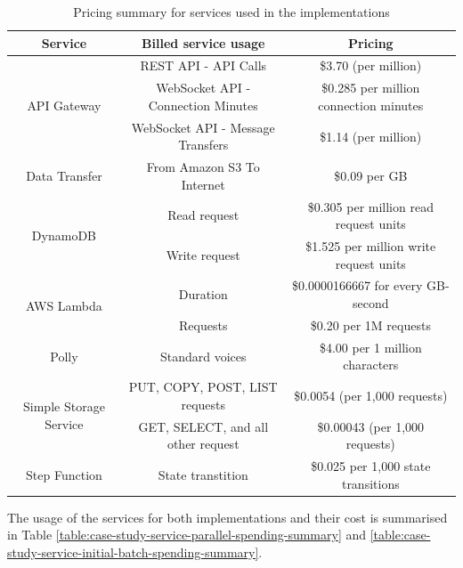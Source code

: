 \begin{table}[H]
    \centering
    \begin{tabular}{ |c|c|c| } 
    \hline
    Service & Billed service usage & Pricing \\
    \hline
    \multirow{3}{*}{API Gateway} & REST API - API Calls & \$3.70 (per million) \\ 
    & WebSocket API - Connection Minutes & \$0.285 per million connection minutes \\ 
    & WebSocket API - Message Transfers & \$1.14 (per million) \\ 
    \hline
    Data Transfer & From Amazon S3 To Internet & \$0.09 per GB \\
    \hline
    \multirow{2}{*}{DynamoDB} & Read request & \$0.305 per million read request units \\
    & Write request & \$1.525 per million write request units \\
    \hline
    \multirow{2}{*}{AWS Lambda} & Duration & \$0.0000166667 for every GB-second \\
    & Requests & \$0.20 per 1M requests \\
    \hline
    Polly & Standard voices & \$4.00 per 1 million characters \\
    \hline
    \multirow{2}{*}{Simple Storage Service} & PUT, COPY, POST, LIST requests & \$0.0054 (per 1,000 requests) \\
    & GET, SELECT, and all other request & \$0.00043 (per 1,000 requests) \\
    \hline
    Step Function & State transtition & \$0.025 per 1,000 state transitions\\
    \hline
    \end{tabular}
    \caption{Pricing summary for services used in the implementations}
    \label{table:case-study-service-spendings-summary}
\end{table}

The usage of the services for both implementations and their cost is summarised in Table \ref{table:case-study-service-parallel-spending-summary} and \ref{table:case-study-service-initial-batch-spending-summary}.

